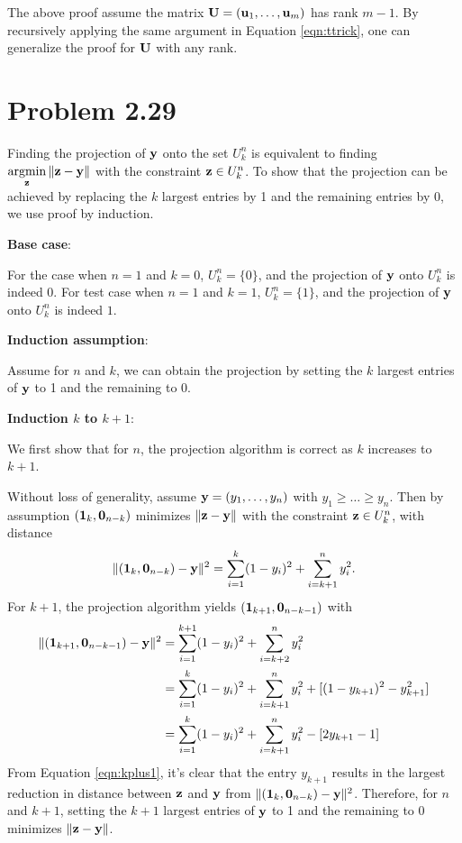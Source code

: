 \documentclass{scrartcl}
\begin{document}
The above proof assume the matrix $\mathbf{U} = (\mathbf{u}_1,\dotsc,\mathbf{u}_m)$
has rank $m-1$. By recursively applying the same argument in Equation \eqref{eqn:ttrick},
one can generalize the proof for $\mathbf{U}$ with any rank.


\section*{Problem 2.29}

Finding the projection of $\mathbf{y}$ onto the set $U_k^n$ is equivalent to
finding $\argmin_\mb{z} \| \mb{z} - \mb{y} \|$ with the constraint $\mathbf{z} \in U_k^n$.
To show that the projection can be achieved by replacing the $k$ largest entries by
1 and the remaining entries by 0, we use proof by induction.

\textbf{Base case}:

For the case when $n = 1$ and $k = 0$, $U_k^n = \{0\}$, and the projection
of $\mathbf{y}$ onto $U_k^n$ is indeed $0$. For test case when $n = 1$ and $k = 1$, 
$U_k^n = \{1\}$, and the projection of $\mathbf{y}$ onto $U_k^n$ is indeed $1$.

\textbf{Induction assumption}:

Assume for $n$ and $k$, we can obtain the projection by setting the $k$ largest
entries of $\mathbf{y}$ to 1 and the remaining to 0.

\textbf{Induction $k$ to $k+1$}:

We first show that for $n$, the projection algorithm is correct
as $k$ increases to $k+1$.

Without loss of generality, assume $\mathbf{y} = (y_1, \dotsc, y_n)$ with
$y_1 \ge \dotsc \ge y_n$. Then by assumption $(\mathbf{1}_k, \mathbf{0}_{n-k})$
minimizes $\| \mathbf{z} - \mathbf{y} \|$ with the constraint $\mathbf{z} \in U_k^n$, with distance
\begin{equation}
	\| (\mathbf{1}_k, \mathbf{0}_{n-k}) - \mathbf{y} \|^2
	= \sum_{i=1}^k (1-y_i)^2 + \sum_{i=k+1}^n y_i^2 .
\end{equation}
For $k+1$, the projection algorithm yields $(\mathbf{1}_{k+1}, \mathbf{0}_{n-k-1})$ with
\begin{equation}
	\begin{split}
	\| (\mathbf{1}_{k+1}, \mathbf{0}_{n-k-1}) - \mathbf{y} \|^2
	& = \sum_{i=1}^{k+1} (1-y_i)^2 + \sum_{i=k+2}^n y_i^2 \\
	& = \sum_{i=1}^k (1-y_i)^2 + \sum_{i=k+1}^n y_i^2 + [(1-y_{k+1})^2-y_{k+1}^2] \\
	& = \sum_{i=1}^k (1-y_i)^2 + \sum_{i=k+1}^n y_i^2 - [2y_{k+1} - 1]
	\end{split}
	\label{eqn:kplus1}
\end{equation}
From Equation \eqref{eqn:kplus1}, it's clear that the entry $y_{k+1}$ results in the largest
reduction in distance between $\mathbf{z}$ and $\mathbf{y}$ from
$\| (\mathbf{1}_k, \mathbf{0}_{n-k}) - \mathbf{y} \|^2$.
Therefore, for $n$ and $k+1$, setting the $k+1$ largest entries of $\mathbf{y}$ to 1 and the remaining
to 0 minimizes $\| \mathbf{z} - \mathbf{y} \|$.
\end{document}
